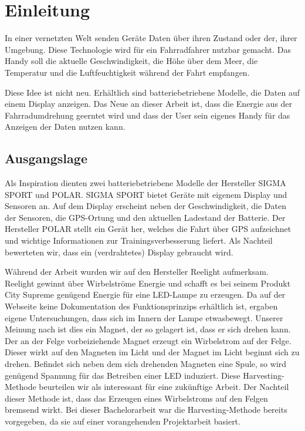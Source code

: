 \chapter{Einleitung}

In einer vernetzten Welt senden Geräte Daten über ihren Zustand oder der, ihrer Umgebung. Diese Technologie wird für ein Fahrradfahrer nutzbar gemacht. Das Handy soll die aktuelle Geschwindigkeit, die Höhe über dem Meer, die Temperatur und die Luftfeuchtigkeit während der Fahrt empfangen.

Diese Idee ist nicht neu. Erhältlich sind batteriebetriebene Modelle, die Daten auf einem Display anzeigen. Das Neue an dieser Arbeit ist, dass die Energie aus der Fahrradumdrehung geerntet wird und dass der User sein eigenes Handy für das Anzeigen der Daten nutzen kann.


\section{Ausgangslage}

Als Inspiration dienten zwei batteriebetriebene Modelle der Hersteller SIGMA SPORT und POLAR. SIGMA SPORT bietet Geräte mit eigenem Display und  Sensoren an. Auf dem Display erscheint neben der Geschwindigkeit, die Daten der Sensoren, die GPS-Ortung und den aktuellen Ladestand der Batterie. Der Hersteller POLAR stellt ein Gerät her, welches die Fahrt über GPS aufzeichnet und wichtige Informationen zur Trainingsverbesserung liefert. Als Nachteil bewerteten wir, dass ein (verdrahtetes) Display gebraucht wird.

Während der Arbeit wurden wir auf den Hersteller Reelight aufmerksam. Reelight gewinnt über Wirbelströme Energie und schafft es bei seinem Produkt City Supreme genügend Energie für eine LED-Lampe zu erzeugen. Da auf der Webseite keine Dokumentation des Funktionsprinzips erhältlich ist, ergaben eigene Untersuchungen, dass sich im Innern der Lampe \glqq etwas\grqq bewegt. Unserer Meinung nach ist dies ein Magnet, der so gelagert ist, dass er sich drehen kann. Der an der Felge vorbeiziehende Magnet erzeugt ein Wirbelstrom auf der Felge. Dieser wirkt auf den Magneten im Licht und der Magnet im Licht beginnt sich zu drehen. Befindet sich neben dem sich drehenden Magneten eine Spule, so wird genügend Spannung für das Betreiben einer LED induziert. Diese Harvesting-Methode beurteilen wir als interessant für eine zukünftige Arbeit. Der Nachteil dieser Methode ist, dass das Erzeugen eines Wirbelstroms auf den Felgen bremsend wirkt.  Bei dieser Bachelorarbeit war die Harvesting-Methode bereits vorgegeben, da sie auf einer vorangehenden Projektarbeit basiert.

